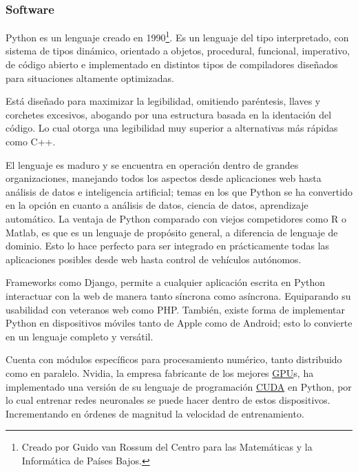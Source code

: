 

\subsubsection{Software}

Python es un lenguaje creado en 1990\footnote{Creado por Guido van Rossum del
Centro para las Matemáticas y la Informática de Países Bajos.}. Es un lenguaje
del tipo interpretado, con sistema de tipos dinámico, orientado a objetos,
procedural, funcional, imperativo, de código abierto e implementado en distintos
tipos de compiladores diseñados para situaciones altamente optimizadas.

Está diseñado para maximizar la legibilidad, omitiendo paréntesis, llaves y
corchetes excesivos, abogando por una estructura basada en la identación del
código. Lo cual otorga una legibilidad muy superior a alternativas más rápidas
como C++. 

El lenguaje es maduro y se encuentra en operación dentro de grandes
organizaciones, manejando todos los aspectos desde aplicaciones web hasta
análisis de datos e inteligencia artificial; temas en los que Python se ha
convertido en la opción en cuanto a análisis de datos, ciencia de datos,
aprendizaje automático. La ventaja de Python comparado con viejos competidores
como R o Matlab, es que es un lenguaje de propósito general, a diferencia de
lenguaje de dominio. Esto lo hace perfecto para ser integrado en prácticamente
todas las aplicaciones posibles desde web hasta control de vehículos autónomos. 

Frameworks como Django, permite a cualquier aplicación escrita en Python
interactuar con la web de manera tanto síncrona como asíncrona. Equiparando su
usabilidad con veteranos web como PHP. También, existe forma de implementar
Python en dispositivos móviles tanto de Apple como de Android; esto lo convierte
en un lenguaje completo y versátil.

Cuenta con módulos específicos para procesamiento numérico, tanto distribuido
como en paralelo. Nvidia, la empresa fabricante de los mejores
\hyperlink{abbr}{GPU}s, ha implementado una versión de su lenguaje de
programación \hyperlink{abbr}{CUDA} en Python, por lo cual entrenar redes
neuronales se puede hacer dentro de estos dispositivos. Incrementando en órdenes
de magnitud la velocidad de entrenamiento.

